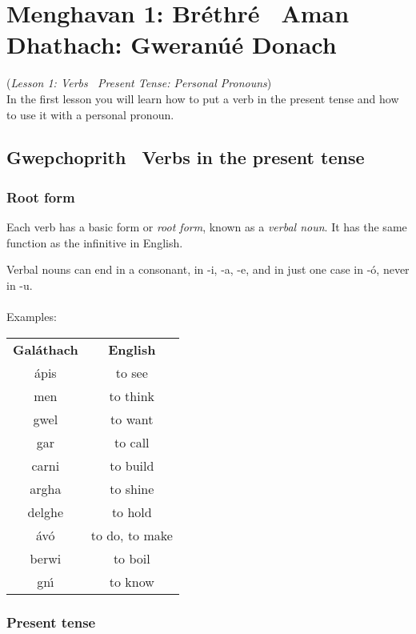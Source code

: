 \section{Menghavan 1: Br\'{e}thr\'{e} \textendash\ Aman Dhathach:  Gweran\'{u}\'{e} Donach}
(\textit{Lesson 1: Verbs  \textendash\ Present Tense: Personal Pronouns})\\

In the first lesson you will learn how to put a verb in the present tense and how to use it with a personal pronoun.

\subsection{Gwepchoprith \textendash\ Verbs in the present tense}

\subsubsection{Root form}

Each verb has a basic form or \textit{root form}, known as a \textit{verbal noun}. It has the same function as the infinitive in English.

Verbal nouns can end in a consonant, in -i, -a, -e, and in just one case in -\'{o}, never in -u.\\\\
Examples:
\begin{table}[H]
\centering
\begin{tabular}{cc}
  \toprule
  \textbf{Gal\'{a}thach} & \textbf{English}\\
  \cmidrule(lr){1-1}\cmidrule{2-2}
  \'{a}pis & to see\\
  men & to think\\
  gwel & to want\\
  gar & to call\\
  carni & to build\\
  argha & to shine\\
  delghe & to hold\\
  \'{a}v\'{o} & to do, to make\\
  berwi & to boil\\
  gn\'{\i} & to know\\
  \bottomrule
\end{tabular}
\label{examples_verbal_nouns}
\end{table}

\subsubsection{Present tense}

